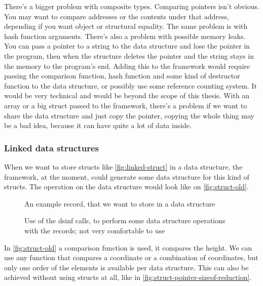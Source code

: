 \documentclass[a4paper,11pt]{article}
\begin{document}
		There's a bigger problem with composite types. Comparing pointers isn't obvious. You may want to compare
		addresses or the contents under that address, depending if you want object or structural equality. The
		same problem is with hash function arguments. There's also a problem with possible memory leaks. You can
		pass a pointer to a string to the data structure and lose the pointer in the program, then when the
		structure deletes the pointer and the string stays in the memory to the program's end. Adding this to
		the framework would require passing the comparison function, hash function and some kind of destructor
		function to the data structure, or possibly use some reference counting system. It would be very
		technical and would be beyond the scope of this thesis. With an array or a big struct passed to the
		framework, there's a problem if we want to share the data structure and just copy the pointer, copying
		the whole thing may be a bad idea, because it can have quite a lot of data inside.

		\subsubsection{Linked data structures}

			When we want to store structs like \autoref{fig:linked-struct} in a data structure, the
			framework, at the moment, could generate some data structure for this kind of structs. The
			operation on the data structure would look like on \autoref{fig:struct-old}.

            \begin{figure}[h!]
				

				\caption{An example record, that we want to store in a data structure}

				\label{fig:linked-struct}
			\end{figure}

            \begin{figure}[h!]
				

				\caption{Use of the dsinf calls, to perform some data structure operations with the
				records; not very comfortable to use}

				\label{fig:struct-old}
			\end{figure}

			In \autoref{fig:struct-old} a comparison function is used, it compares the height. We can use
			any function that compares a coordinate or a combination of coordinates, but only one order of
			the elements is available per data structure. This can also be achieved without using structs at
			all, like in \autoref{fig:struct-pointer-sizeof-reduction}.
\end{document}
